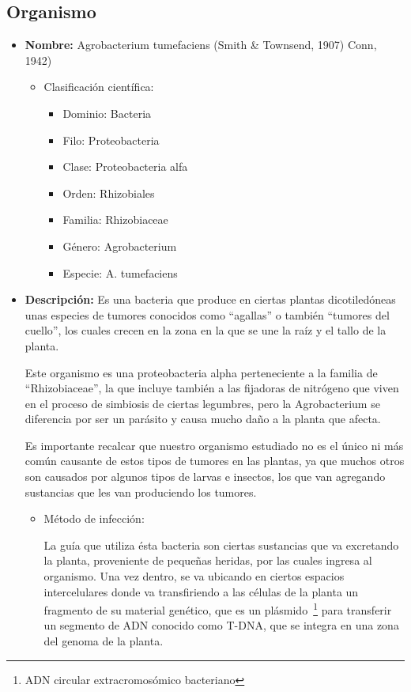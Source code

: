 \subsection{Organismo}
\begin{itemize}
	\item \textbf{Nombre:}
		 Agrobacterium tumefaciens (Smith \& Townsend, 1907) Conn, 1942)
	\begin{itemize}
		\item Clasificación científica:
		\begin{itemize}
			\item Dominio: 	Bacteria
			\item Filo: 	Proteobacteria
			\item Clase: 	Proteobacteria alfa
			\item Orden: 	Rhizobiales
			\item Familia: 	Rhizobiaceae
			\item Género: 	Agrobacterium
			\item Especie: 	A. tumefaciens
		\end{itemize}
	\end{itemize}
	\item \textbf{Descripción:}
		Es una bacteria que produce en ciertas plantas dicotiledóneas unas especies
		de tumores conocidos como ``agallas'' o también ``tumores del cuello'',
		los cuales crecen en la zona en la que se une la raíz y el tallo de la planta.

		Este organismo es una proteobacteria alpha perteneciente a la familia de ``Rhizobiaceae'',
		la que incluye también a las fijadoras de nitrógeno que viven en el proceso de simbiosis
		de ciertas legumbres, pero la Agrobacterium se diferencia por ser un parásito y causa
		mucho daño a la planta que afecta.

		Es importante recalcar que nuestro organismo estudiado no es el único ni más común
		causante de estos tipos de tumores en las plantas, ya que muchos otros son causados
		por algunos tipos de larvas e insectos, los que van agregando sustancias que les
		van produciendo los tumores.
		
		\begin{itemize}
			\item  Método de infección:

				La guía que utiliza ésta bacteria son ciertas sustancias que va excretando la planta,
				proveniente de pequeñas heridas, por las cuales ingresa al organismo. Una vez dentro,
				se va ubicando en ciertos espacios intercelulares donde va transfiriendo a las células
				de la planta un fragmento de su material genético, que es un plásmido~\footnote{ADN circular extracromosómico bacteriano}
				para transferir un segmento de ADN conocido como T-DNA, que se integra en una zona del
				genoma de la planta.			


\end{itemize}
\end{itemize}
